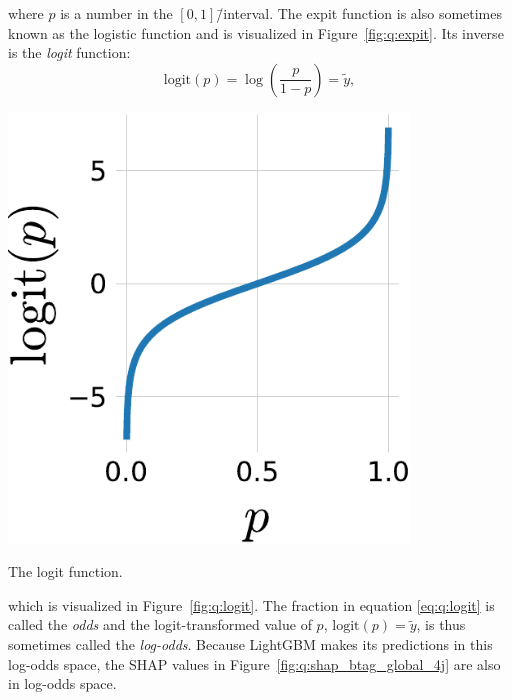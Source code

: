 \noindent where $p$ is a number in the $[0, 1]$\=/interval. The expit function is also sometimes known as the logistic function and is visualized in Figure~\ref{fig:q:expit}. Its inverse is the \emph{logit} function:
\begin{equation}
  \label{eq:q:logit}
  \mathrm{logit}(p) = \log \left( \frac{p}{1-p}  \right) = \tilde{y},
\end{equation}

 \begin{marginfigure}
  \centerfloat
  \includegraphics[width=0.8\textwidth]{figures/logit_expit/logit.pdf}
  \caption[The Logit Function]
          {The logit function.} 
  \label{fig:q:logit}
\end{marginfigure}

 \noindent which is visualized in Figure~\ref{fig:q:logit}. The fraction in equation \eqref{eq:q:logit} is called the \emph{odds} and the logit-transformed value of $p$, $\mathrm{logit}(p)=\tilde{y}$, is thus sometimes called the \emph{log-odds}. Because LightGBM makes its predictions in this log-odds space, the SHAP values in Figure~\ref{fig:q:shap_btag_global_4j} are also in log-odds space. 

